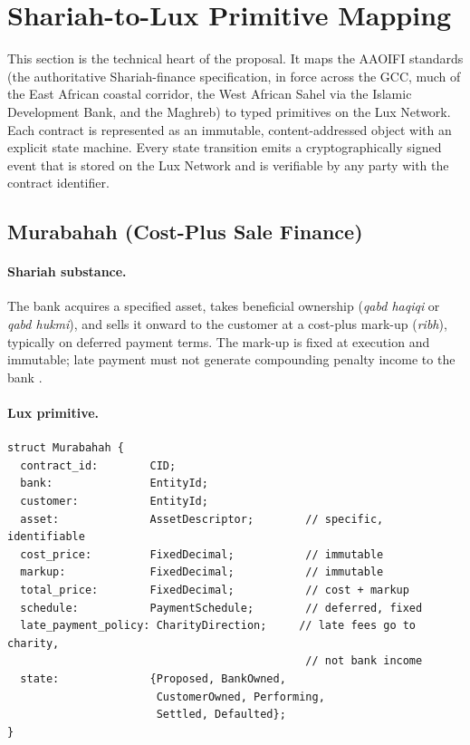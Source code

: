 \documentclass[11pt,letterpaper]{article}
\begin{document}
\section{Shariah-to-Lux Primitive Mapping}

This section is the technical heart of the proposal. It maps the
AAOIFI standards (the authoritative Shariah-finance specification, in
force across the GCC, much of the East African coastal corridor, the
West African Sahel via the Islamic Development Bank, and the Maghreb)
to typed primitives on the Lux Network. Each contract is represented
as an immutable, content-addressed object with an explicit state
machine. Every state transition emits a cryptographically signed event
that is stored on the Lux Network and is verifiable by any party with
the contract identifier.

\subsection{Murabahah (Cost-Plus Sale Finance)}

\paragraph{Shariah substance.} The bank acquires a specified asset,
takes beneficial ownership (\emph{qabd haqiqi} or \emph{qabd hukmi}),
and sells it onward to the customer at a cost-plus mark-up (\emph{ribh}),
typically on deferred payment terms. The mark-up is fixed at execution
and immutable; late payment must not generate compounding penalty
income to the bank \cite{aaoifi_standards}.

\paragraph{Lux primitive.}
\begin{verbatim}
struct Murabahah {
  contract_id:        CID;
  bank:               EntityId;
  customer:           EntityId;
  asset:              AssetDescriptor;        // specific, identifiable
  cost_price:         FixedDecimal;           // immutable
  markup:             FixedDecimal;           // immutable
  total_price:        FixedDecimal;           // cost + markup
  schedule:           PaymentSchedule;        // deferred, fixed
  late_payment_policy: CharityDirection;     // late fees go to charity,
                                              // not bank income
  state:              {Proposed, BankOwned,
                       CustomerOwned, Performing,
                       Settled, Defaulted};
}
\end{verbatim}
\end{document}
